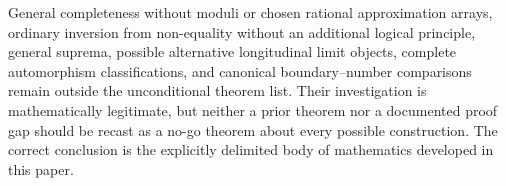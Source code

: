 General completeness without moduli or chosen rational approximation arrays, ordinary inversion from non-equality without an additional logical principle, general suprema, possible alternative longitudinal limit objects, complete automorphism classifications, and canonical boundary--number comparisons remain outside the unconditional theorem list. Their investigation is mathematically legitimate, but neither a prior theorem nor a documented proof gap should be recast as a no-go theorem about every possible construction. The correct conclusion is the explicitly delimited body of mathematics developed in this paper.
